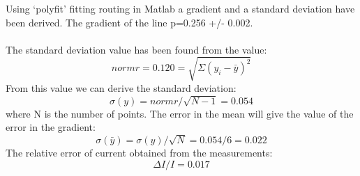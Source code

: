 \documentclass[twocolumn]{article}
\begin{document}
\noindent
Using ‘polyfit’ fitting routing in Matlab a gradient and a standard deviation have been derived. The gradient of the line p=0.256 +/- 0.002. \\
\\
The standard deviation value has been found from the value:
\begin{equation}
normr=0.120=\sqrt{\Sigma(y_i - \bar{y})^2}
\end{equation}
From this value we can derive the standard deviation:
\begin{equation}
\sigma(y) = normr/\sqrt{N-1} = 0.054
\end{equation}
where N is the number of points. The error in the mean will give the value of the error in the gradient:
\begin{equation}
\sigma(\bar{y}) = \sigma(y)/\sqrt{N} = 0.054/6 = 0.022
\end{equation}
The relative error of current obtained from the measurements:
\begin{equation}
\Delta I/I = 0.017
\end{equation}
\end{document}
